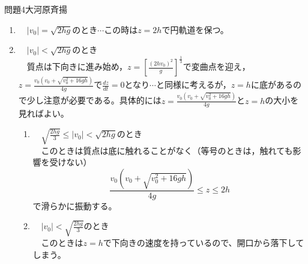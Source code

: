 \documentclass[fleqn]{jbook}
\def\ds{\displaystyle}
\begin{document}
\begin{answer}{問題4}{大河原斉揚}
\begin{enumerate}
\begin{enumerate}
    \item 　$|v_{0}|=\sqrt{2hg}$のとき$\cdots$この時は$z=2h$で円軌道を保つ。\\
    
    \item 　$|v_{0}|<\sqrt{2hg}$のとき\\
　質点は下向きに進み始め，$\ds z=\left[\frac{\left(2hv_{0}\right)^{2}}{g}\right]^{\frac{1}{3}}$で変曲点を迎え，$\ds z=\frac{v_{0}\left(v_{0}+\sqrt{v_{0}^{2}+16gh}\right)}{4g}$で$\ds \frac{dz}{dt}=0$となり$\cdots$と同様に考えるが，$z=h$に底があるので少し注意が必要である。具体的には$\ds z=\frac{v_{0}\left(v_{0}+\sqrt{v_{0}^{2}+16gh}\right)}{4g}$と$z=h$の大小を見ればよい。\\

\begin{enumerate}
    \item 　$\ds \sqrt{\frac{2hg}{3}} \leq |v_{0}| < \sqrt{2hg}$のとき\\
　このときは質点は底に触れることがなく（等号のときは，触れても影響を受けない）\\
$$\frac{v_{0}\left(v_{0}+\sqrt{v_{0}^{2}+16gh}\right)}{4g} \leq z \leq 2h$$
で滑らかに振動する。\\

    \item 　$\ds |v_{0}| < \sqrt{\frac{2hg}{3}}$のとき\\
　このときは$z=h$で下向きの速度を持っているので、開口から落下してしまう。\\

    \end{enumerate}
    
  \end{enumerate}

\end{enumerate}

\end{answer}
\end{document}
